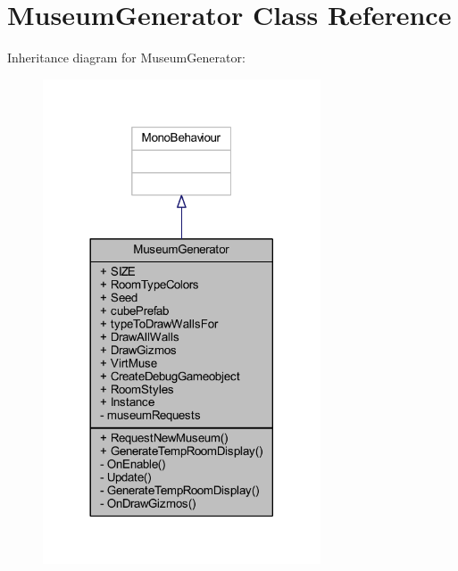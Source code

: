 \hypertarget{class_museum_generator}{}\section{Museum\+Generator Class Reference}
\label{class_museum_generator}


Inheritance diagram for Museum\+Generator\+:
\nopagebreak
\begin{figure}[H]
\begin{center}
\leavevmode
\includegraphics[width=233pt]{class_museum_generator__inherit__graph}
\end{center}
\end{figure}


